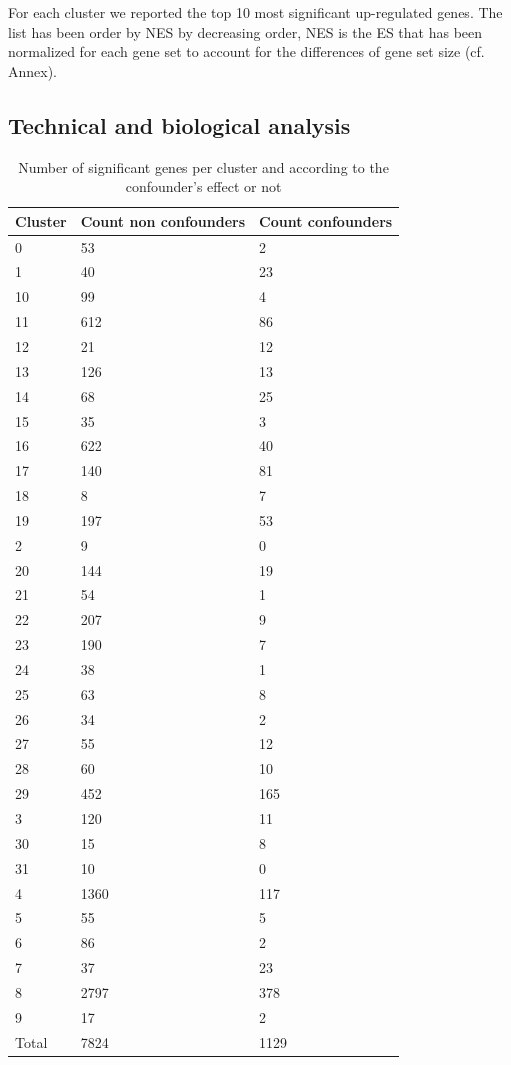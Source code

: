 \documentclass[a4paper, 11pt]{article}
\begin{document}
\begin{multicols}{2}
For each cluster we reported the top  10 most significant up-regulated genes. The list has been order by NES by decreasing order, NES is the ES that has been normalized for each gene set to account for the differences of gene set size (cf. Annex).

\subsection{Technical and biological analysis}

\begin{table}[h]
\begin{tabular}{lll}
Cluster & Count non confounders & Count confounders \\ \hline
0 & 53 & 2 \\
1 & 40 & 23 \\
10 & 99 & 4 \\
11 & 612 & 86 \\
12 & 21 & 12 \\
13 & 126 & 13 \\
14 & 68 & 25 \\
15 & 35 & 3 \\
16 & 622 & 40 \\
17 & 140 & 81 \\
18 & 8 & 7 \\
19 & 197 & 53 \\
2 & 9 & 0 \\
20 & 144 & 19 \\
21 & 54 & 1 \\
22 & 207 & 9 \\
23 & 190 & 7 \\
24 & 38 & 1 \\
25 & 63 & 8 \\
26 & 34 & 2 \\
27 & 55 & 12 \\
28 & 60 & 10 \\
29 & 452 & 165 \\
3 & 120 & 11 \\
30 & 15 & 8 \\
31 & 10 & 0 \\
4 & 1360 & 117 \\
5 & 55 & 5 \\
6 & 86 & 2 \\
7 & 37 & 23 \\
8 & 2797 & 378 \\
9 & 17 & 2 \\ \hline
Total & 7824 & 1129
\end{tabular}
\caption{Number of significant genes per cluster and according to the confounder's effect or not}
\label{tab:sigCount}
\end{table}


\end{multicols}
\end{document}
